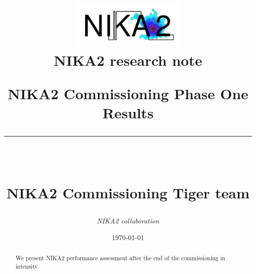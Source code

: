 \documentclass[a4paper, 11pt]{report}
\makeatletter
\renewcommand{\maketitle}{ %
\begin{flushleft} %
{\LARGE\@title} %

\vspace{50pt} %

{\large\@author} %
\\\@date %

\vspace{40pt} %
\end{flushleft}
}
\makeatother
\begin{document}
\title{\parbox{16cm}{
    \includegraphics[width=5.5cm]{Figures/Logo_NIKA2.pdf} \\ [5mm]   
    \textbf{NIKA2 research note} \\ [5cm]   
    \begin{center}\sf\bfseries\huge
      NIKA2 Commissioning Phase One Results \\ [-4mm]
      \rule{16cm}{1pt}\\    
    \end{center}
    \hfill
    \scriptsize NIKA2 Commissioning Tiger team \\ [5cm]
  }
}
\author{{\textit{NIKA2 collaboration}}  }
\date{\today}

\maketitle %
%
%
%


\tableofcontents

\clearpage
\listoffigures
\listoftables


\newpage
{}

\begin{abstract}
We present NIKA2 performance assessment after the end of the commissioning in intensity.
\end{abstract}


\end{document}
